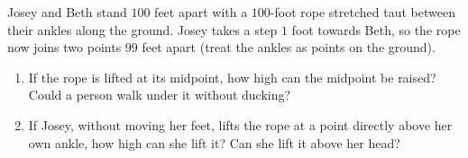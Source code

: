 Josey and Beth stand $100$ feet apart with a $100$-foot rope stretched taut between their ankles along the ground. Josey takes a step $1$ foot towards Beth, so the rope now joins two points $99$ feet apart (treat the ankles as points on the ground).
\begin{enumerate}
\item[(a)] If the rope is lifted at its midpoint, how high can the midpoint be raised? Could a person walk under it without ducking?
\item[(b)] If Josey, without moving her feet, lifts the rope at a point directly above her own ankle, how high can she lift it? Can she lift it above her head?
\end{enumerate}
